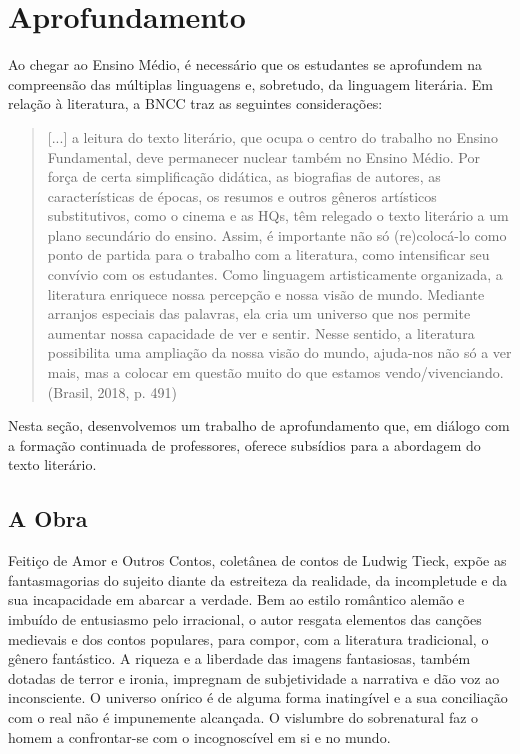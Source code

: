 \documentclass[11pt]{extarticle}
\begin{document}

\section{Aprofundamento}

Ao chegar ao Ensino Médio, é necessário que os estudantes se aprofundem
na compreensão das múltiplas linguagens e, sobretudo, da linguagem
literária. Em relação à literatura, a BNCC traz as seguintes
considerações:

\begin{quote}
{[}...{]} a leitura do texto literário, que ocupa o centro do trabalho
no Ensino Fundamental, deve permanecer nuclear também no Ensino Médio.
Por força de certa simplificação didática, as biografias de autores, as
características de épocas, os resumos e outros gêneros artísticos
substitutivos, como o cinema e as HQs, têm relegado o texto literário a
um plano secundário do ensino. Assim, é importante não só (re)colocá-lo
como ponto de partida para o trabalho com a literatura, como
intensificar seu convívio com os estudantes. Como linguagem
artisticamente organizada, a literatura enriquece nossa percepção e
nossa visão de mundo. Mediante arranjos especiais das palavras, ela cria
um universo que nos permite aumentar nossa capacidade de ver e sentir.
Nesse sentido, a literatura possibilita uma ampliação da nossa visão do
mundo, ajuda-nos não só a ver mais, mas a colocar em questão muito do
que estamos vendo/vivenciando. (Brasil, 2018, p. 491)
\end{quote}

Nesta seção, desenvolvemos um trabalho de aprofundamento que, em diálogo
com a formação continuada de professores, oferece subsídios para a
abordagem do texto literário.

\subsection{A Obra}

Feitiço de Amor e Outros Contos, coletânea de contos de Ludwig Tieck,
expõe as fantasmagorias do sujeito diante da estreiteza da realidade, da
incompletude e da sua incapacidade em abarcar a verdade. Bem ao estilo
romântico alemão e imbuído de entusiasmo pelo irracional, o autor
resgata elementos das canções medievais e dos contos populares, para
compor, com a literatura tradicional, o gênero fantástico. A riqueza e a
liberdade das imagens fantasiosas, também dotadas de terror e ironia,
impregnam de subjetividade a narrativa e dão voz ao inconsciente. O
universo onírico é de alguma forma inatingível e a sua conciliação com o
real não é impunemente alcançada. O vislumbre do sobrenatural faz o
homem a confrontar-se com o incognoscível em si e no mundo.
\end{document}
